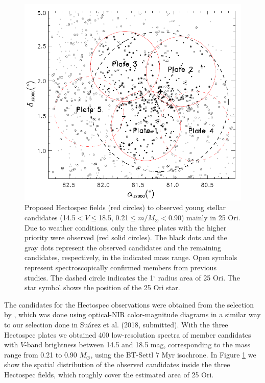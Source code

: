 \documentclass[12pt]{article}
\newcounter{subsubsubsection}[subsubsection]
\begin{document}
\begin{figure}%
	\includegraphics[width=1.0\textwidth]{sky_MMT.pdf}
	\caption[Plate design for the Hectospec observations.]{Proposed Hectospec fields (red circles) to observed young stellar candidates (14.5$<V\leq$18.5, 0.21$\leq m/M_\odot <$0.90) mainly in 25 Ori. Due to weather conditions, only the three plates with the higher priority were observed (red solid circles). The black dots and the gray dots represent the observed candidates and the remaining candidates, respectively, in the indicated mass range. Open symbols represent spectroscopically confirmed members from previous studies. The dashed circle indicates the 1$^\circ$ radius area of 25 Ori. The star symbol shows the position of the 25 Ori star.}
	\label{fig:sky_MMT}
\end{figure}

\label{sec_Hectospec:targets}
The candidates for the Hectospec observations were obtained from the selection by \citet{Downes2014}, which was done using optical-NIR color-magnitude diagrams in a similar way to our selection done in Su\'arez et al. (2018, submitted). With the three Hectospec plates we obtained 400 low-resolution spectra of member candidates with $V$-band brightness between 14.5 and 18.5 mag, corresponding to the mass range from 0.21 to 0.90 $M_\odot$, using the BT-Settl 7 Myr isochrone. In Figure \ref{fig:sky_MMT} we show the spatial distribution of the observed candidates inside the three Hectospec fields, which roughly cover the estimated area of 25 Ori.
\end{document}
